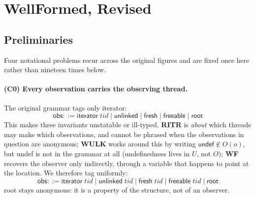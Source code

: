 %
%
%
%
\section{\textsf{WellFormed}, Revised}
\label{sec:inv-revised}

\newcommand{\obs}{\textsf{obs}}
\newcommand{\itr}{\textsf{iterator}}
\newcommand{\unlk}{\textsf{unlinked}}
\newcommand{\frsh}{\textsf{fresh}}
\newcommand{\frbl}{\textsf{freeable}}
\newcommand{\rt}{\textsf{root}}
\newcommand{\undf}{\textsf{undef}}
\newcommand{\Loc}{\textsf{Loc}}
\newcommand{\TID}{\textsf{TID}}
\newcommand{\FType}{\textsf{FType}}
\newcommand{\RCU}{\textsf{RCU}}
\newcommand{\defn}{\;\triangleq\;}

\subsection{Preliminaries}
\label{sec:inv-prelim}

Four notational problems recur across the original figures and are fixed once
here rather than nineteen times below.

\paragraph{(C0) Every observation carries the observing thread.}
The original grammar tags only \itr:
\[\obs ::= \itr\;\mathit{tid} \mid \unlk \mid \frsh \mid \frbl \mid \rt\]
This makes three invariants unstatable or ill-typed.  \textbf{RITR} is
\emph{about} which threads may make which observations, and cannot be phrased
when the observations in question are anonymous; \textbf{WULK} works around this
by writing $\textsf{undef}\notin O(o)$, but \textsf{undef} is not in the grammar
at all (undefinedness lives in $U$, not $O$); \textbf{WF} recovers the observer
only indirectly, through a variable that happens to point at the location.  We
therefore tag uniformly:
\[\obs ::= \itr\;\mathit{tid} \mid \unlk\;\mathit{tid} \mid \frsh\;\mathit{tid} \mid \frbl\;\mathit{tid} \mid \rt\]
\rt{} stays anonymous: it is a property of the structure, not of an observer.

